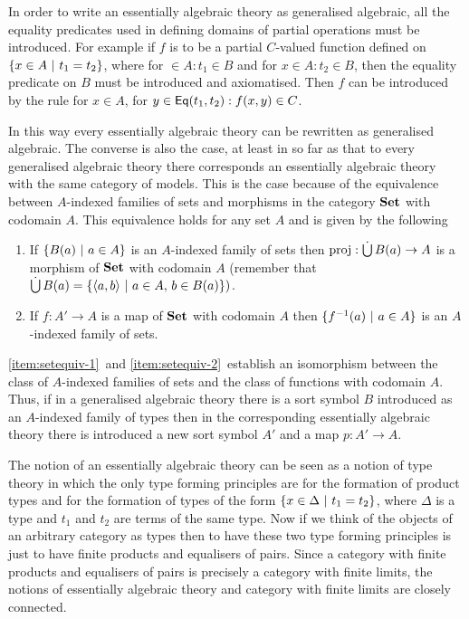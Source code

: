 In order to write an essentially algebraic theory as generalised algebraic, all the equality predicates used in defining domains of partial operations must be introduced.
%
For example if $f$ is to be a partial $C$-valued function defined on $\{ x \in A \ |\  t_1 = t_2 \}$, where for $ \in A : t_1 \in B$ and for $x \in A : t_2 \in B$, then the equality predicate on $B$ must be introduced and axiomatised.
%
Then $f$ can be introduced by the rule for $x \in A$, for $y \in \mathsf{Eq}(t_1,t_2) : f(x,y) \in C$.


In this way every essentially algebraic theory can be rewritten as generalised algebraic.
%
The converse is also the case, at least in so far as that to every generalised algebraic theory there corresponds an essentially algebraic theory with the same category of models.
%
This is the case because of the equivalence between $A$-indexed families of sets and morphisms in the category $\mathbf{Set}$ with codomain $A$.
%
This equivalence holds for any set $A$ and is given by the following

\begin{enumerate}[1.]
 	\item \label{item:setequiv-1} If $\{ B(a) \ |\  a \in A \}$ is an $A$-indexed family of sets then $\operatorname{proj} : \mathop{\dot{\bigcup}} B(a) \to A$ is a morphism of $\mathbf{Set}$ with codomain $A$ (remember that $\mathop{\dot{\bigcup}} B(a) = \{\langle a,b \rangle \ |\  a \in A,\, b \in B(a) \})$.
	\item \label{item:setequiv-2} If $f : A' \to A$ is a map of $\mathbf{Set}$ with codomain $A$ then $\{ f^{-1}(a) \ |\  a \in A \}$ is an $A$-indexed family of sets.
\end{enumerate}

\ref{item:setequiv-1}~and \ref{item:setequiv-2}~establish an isomorphism between the class of $A$-indexed families of sets and the class of functions with codomain $A$.
%
%
Thus, if in a generalised algebraic theory there is a sort symbol $B$ introduced as an $A$-indexed family of types then in the corresponding essentially algebraic theory there is introduced a new sort symbol $A'$ and a map $p : A' \to A$.

The notion of an essentially algebraic theory can be seen as a notion of type theory in which the only type forming principles are for the formation of product types and for the formation of types of the form $\{ x \in \Delta \ |\  t_1 = t_2 \}$, where $\Delta$ is a type and $t_1$ and $t_2$ are terms of the same type.
%
Now if we think of the objects of an arbitrary category as types then to have these two type forming principles is just to have finite products and equalisers of pairs.
%
%
Since a category with finite products and equalisers of pairs is precisely a category with finite limits, the notions of essentially algebraic theory and category with finite limits are closely connected.

